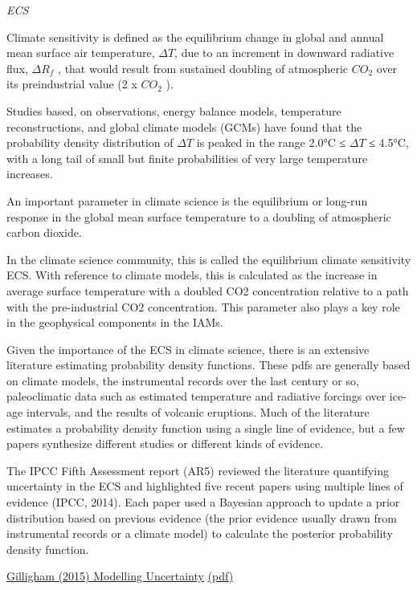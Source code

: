 \documentclass[
]{book}
\begin{document}
\emph{ECS}

Climate sensitivity is defined as the equilibrium change in global and annual mean
surface air temperature, \(\Delta T\), due to an increment in
downward radiative flux, \(\Delta R_{f}\) ,
that would result from sustained doubling of atmospheric \(CO_2\) over its
preindustrial value (2 x \(CO_2\) ).

Studies based, on observations, energy balance models, temperature reconstructions,
and global climate models (GCMs) have found that the probability
density distribution of \(\Delta T\) is peaked in the range
2.0°C ≤ \(\Delta T\) ≤ 4.5°C, with a long tail of small but
finite probabilities of very large temperature increases.

An important parameter in climate science is
the equilibrium or long-run response in the global mean surface temperature
to a doubling of atmospheric carbon dioxide.

In the climate science community, this is called
the equilibrium climate sensitivity ECS.
With reference to climate models, this is calculated as
the increase in average surface temperature with a doubled CO2 concentration
relative to a path with the pre-industrial CO2 concentration.
This parameter also plays a key role in the geophysical components
in the IAMs.

Given the importance of the ECS in climate science,
there is an extensive literature estimating probability density functions.
These pdfs are generally based on climate models, the instrumental
records over the last century or so, paleoclimatic data such
as estimated temperature and radiative forcings over ice-age intervals,
and the results of volcanic eruptions.
Much of the literature estimates a probability density function
using a single line of evidence,
but a few papers synthesize different studies or different kinds of evidence.

The IPCC Fifth Assessment report (AR5) reviewed the literature
quantifying uncertainty in the ECS and highlighted
five recent papers using multiple lines of evidence (IPCC, 2014).
Each paper used a Bayesian approach to update a prior distribution
based on previous evidence
(the prior evidence usually drawn from instrumental records or a climate model)
to calculate the posterior probability density function.

\href{https://globalchange.mit.edu/publication/16235}{Gilligham (2015) Modelling Uncertainty}
\href{pdf/Gillingham_2015_Modelling_Uncertainty.pdf}{(pdf)}
\end{document}
